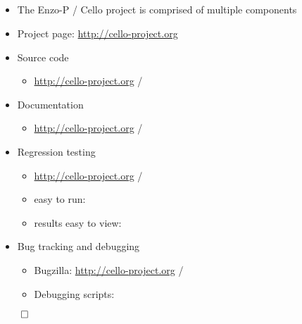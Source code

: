 \NEWSEC

\subsection{\ssProjectSummary}


\begin{frame}[fragile,label=ss-project-summary] 
\secframetitle{\ssProjectSummary}
\begin{itemize}
\item The Enzo-P / Cello project is comprised of multiple components
\item Project page: \url{http://cello-project.org}
\item Source code
\begin{itemize}
\item  \url{http://cello-project.org} / 
\end{itemize}
\item Documentation
\begin{itemize}
\item  \url{http://cello-project.org} / 
\end{itemize}
\item Regression testing
\begin{itemize}
\item  \url{http://cello-project.org} / 
\item easy to run: 
\item results easy to view: 
\end{itemize}
\item Bug tracking and debugging
\begin{itemize}
\item Bugzilla: \url{http://cello-project.org} / 
\item Debugging scripts: 
\end{itemize}
\end{itemize}
\vfill
\centerline{$\qed$}
\end{frame}

